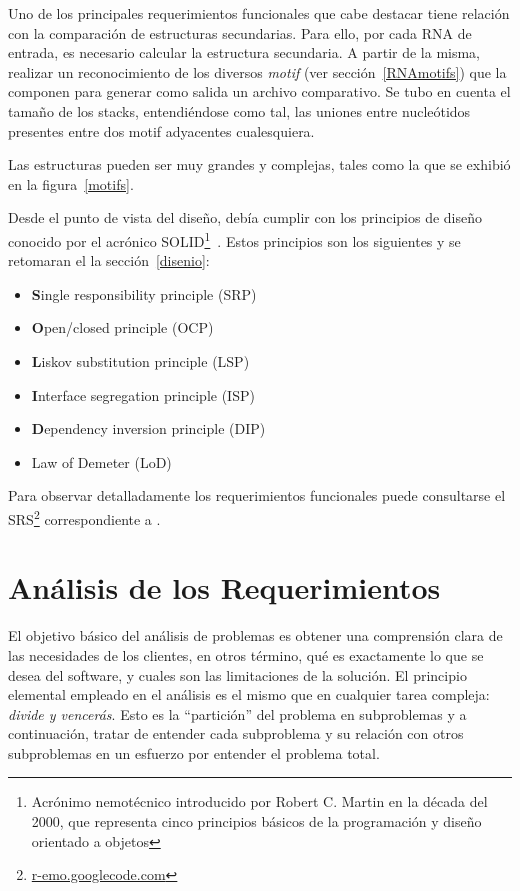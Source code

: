 \par Uno de los principales requerimientos funcionales que cabe destacar tiene relación con la comparación de estructuras secundarias. Para ello, por cada RNA de entrada, es necesario calcular la estructura secundaria. A partir de la misma, realizar un reconocimiento de los diversos \emph{motif} (ver sección~\ref{RNAmotifs}) que la componen para generar como salida un archivo comparativo. Se tubo en cuenta el tamaño de los stacks, entendiéndose como tal, las uniones entre nucleótidos presentes entre dos motif adyacentes cualesquiera.  
\par Las estructuras pueden ser muy grandes y complejas, tales como la que se exhibió en la figura~\ref{motifs}.

\par Desde el punto de vista del diseño, \remo debía cumplir con los principios de diseño conocido por el acrónico SOLID\footnote{Acrónimo nemotécnico introducido por Robert C. Martin en la década del 2000, que representa cinco principios básicos de la programación y diseño orientado a objetos}~\cite{Martin00}. Estos principios son los siguientes y se retomaran el la sección~\ref{disenio}:
\begin{itemize}
	\item \textbf{S}ingle responsibility principle (SRP)
	\item \textbf{O}pen/closed principle (OCP)
	\item \textbf{L}iskov substitution principle (LSP)
	\item \textbf{I}nterface segregation principle (ISP)
	\item \textbf{D}ependency inversion principle (DIP)	
	\item Law of Demeter (LoD)
\end{itemize}

\par Para observar detalladamente los requerimientos funcionales puede consultarse el SRS\footnote{\url{r-emo.googlecode.com}} correspondiente a \remo.

\section{Análisis de los Requerimientos}
\par El objetivo básico del análisis de problemas es obtener una comprensión clara de las necesidades de los clientes, en otros término, qué es exactamente lo que se desea del software, y cuales son las limitaciones de la solución. El principio elemental empleado en el análisis es el mismo que en cualquier tarea compleja: \emph{divide y vencerás}. Esto es la “partición” del problema en subproblemas y a continuación, tratar de entender cada subproblema y su relación con otros subproblemas en un esfuerzo por entender el problema total.


